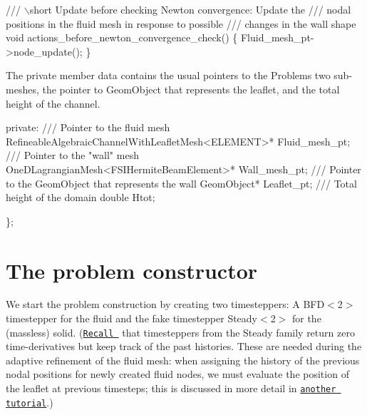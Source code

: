 \begin{DoxyCodeInclude}
\textcolor{comment}{}
\textcolor{comment}{ /// \(\backslash\)short Update before checking Newton convergence: Update the}
\textcolor{comment}{ /// nodal positions in the fluid mesh in response to possible }
\textcolor{comment}{ /// changes in the wall shape}
\textcolor{comment}{} \textcolor{keywordtype}{void} actions\_before\_newton\_convergence\_check()
  \{
   Fluid\_mesh\_pt->node\_update();
  \}

\end{DoxyCodeInclude}


The private member data contains the usual pointers to the {\ttfamily Problem\textquotesingle{}s} two sub-\/meshes, the pointer to {\ttfamily Geom\+Object} that represents the leaflet, and the total height of the channel.


\begin{DoxyCodeInclude}

\textcolor{keyword}{private}:
 \textcolor{comment}{}
\textcolor{comment}{ /// Pointer to the fluid mesh}
\textcolor{comment}{} RefineableAlgebraicChannelWithLeafletMesh<ELEMENT>* Fluid\_mesh\_pt;
\textcolor{comment}{}
\textcolor{comment}{ /// Pointer to the "wall" mesh}
\textcolor{comment}{} OneDLagrangianMesh<FSIHermiteBeamElement>* Wall\_mesh\_pt;
\textcolor{comment}{}
\textcolor{comment}{ /// Pointer to the GeomObject that represents the wall}
\textcolor{comment}{} GeomObject* Leaflet\_pt;
 \textcolor{comment}{}
\textcolor{comment}{ /// Total height of the domain}
\textcolor{comment}{} \textcolor{keywordtype}{double} Htot;

\};

\end{DoxyCodeInclude}




 

\hypertarget{index_constructor}{}\section{The problem constructor}\label{index_constructor}
We start the problem construction by creating two timesteppers\+: A {\ttfamily B\+F\+D$<$2$>$} timestepper for the fluid and the fake timestepper {\ttfamily Steady$<$2$>$} for the (massless) solid. (\href{../../fsi_collapsible_channel_adapt/html/index.html}{\tt Recall } that timesteppers from the {\ttfamily Steady} family return zero time-\/derivatives but keep track of the past histories. These are needed during the adaptive refinement of the fluid mesh\+: when assigning the history of the previous nodal positions for newly created fluid nodes, we must evaluate the position of the leaflet at previous timesteps; this is discussed in more detail in \href{../../fsi_collapsible_channel_adapt/html/index.html}{\tt another tutorial}.)


